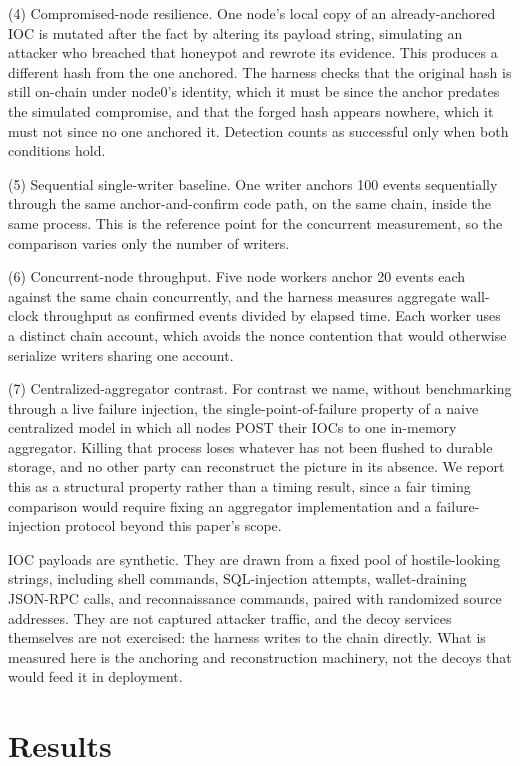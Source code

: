 \documentclass[conference]{IEEEtran}
\begin{document}
(4) Compromised-node resilience. One node's local copy of an already-anchored IOC is mutated after the fact by altering its payload string, simulating an attacker who breached that honeypot and rewrote its evidence. This produces a different hash from the one anchored. The harness checks that the original hash is still on-chain under node0's identity, which it must be since the anchor predates the simulated compromise, and that the forged hash appears nowhere, which it must not since no one anchored it. Detection counts as successful only when both conditions hold.

(5) Sequential single-writer baseline. One writer anchors 100 events sequentially through the same anchor-and-confirm code path, on the same chain, inside the same process. This is the reference point for the concurrent measurement, so the comparison varies only the number of writers.

(6) Concurrent-node throughput. Five node workers anchor 20 events each against the same chain concurrently, and the harness measures aggregate wall-clock throughput as confirmed events divided by elapsed time. Each worker uses a distinct chain account, which avoids the nonce contention that would otherwise serialize writers sharing one account.

(7) Centralized-aggregator contrast. For contrast we name, without benchmarking through a live failure injection, the single-point-of-failure property of a naive centralized model in which all nodes POST their IOCs to one in-memory aggregator. Killing that process loses whatever has not been flushed to durable storage, and no other party can reconstruct the picture in its absence. We report this as a structural property rather than a timing result, since a fair timing comparison would require fixing an aggregator implementation and a failure-injection protocol beyond this paper's scope.

IOC payloads are synthetic. They are drawn from a fixed pool of hostile-looking strings, including shell commands, SQL-injection attempts, wallet-draining JSON-RPC calls, and reconnaissance commands, paired with randomized source addresses. They are not captured attacker traffic, and the decoy services themselves are not exercised: the harness writes to the chain directly. What is measured here is the anchoring and reconstruction machinery, not the decoys that would feed it in deployment.

\section{Results}
\end{document}
